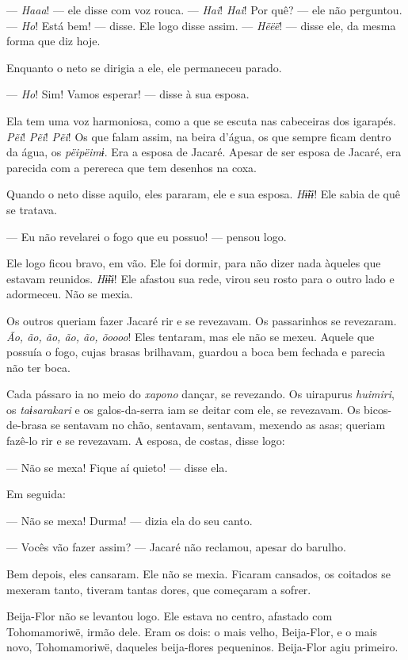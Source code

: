--- \textit{Haaa}! --- ele disse com voz rouca. --- \textit{Hai}! \textit{Hai}! Por quê? --- ele não perguntou. --- \textit{Ho}! Está bem! --- disse. Ele logo disse assim. --- \textit{Hëëë}! --- disse ele, da mesma forma que diz hoje. 

Enquanto o neto se dirigia a ele, ele permaneceu parado. 

--- \textit{Ho}! Sim! Vamos esperar! --- disse à sua esposa. 

Ela tem uma voz harmoniosa, como a que se escuta nas cabeceiras dos
igarapés. \textit{Pẽi}! \textit{Pẽi}! \textit{Pẽi}! Os que falam assim, na beira d'água, os
que sempre ficam dentro da água, os \textit{pëipëimɨ}. Era a esposa de
Jacaré. Apesar de ser esposa de Jacaré, era parecida com a perereca que
tem desenhos na coxa. 

Quando o neto disse aquilo, eles pararam, ele e sua esposa. \textit{Hɨ̃ɨɨ}!
Ele sabia de quê se tratava. 

--- Eu não revelarei o fogo que eu possuo! --- pensou logo. 

Ele logo ficou bravo, em vão. Ele foi dormir, para não dizer nada
àqueles que estavam reunidos. \textit{Hɨ̃ɨɨ}! Ele afastou sua rede, virou
seu rosto para o outro lado e adormeceu. Não se mexia. 

Os outros queriam fazer Jacaré rir e se revezavam. Os passarinhos se
revezaram. \textit{Ão, ão, ão, ão, ão, õoooo}! Eles tentaram, mas ele não
se mexeu. Aquele que possuía o fogo, cujas brasas brilhavam, guardou a
boca bem fechada e parecia não ter boca. 

Cada pássaro ia no meio do \textit{xapono} dançar, se revezando.
Os uirapurus \textit{huimiri}, os \textit{taɨsarakari} e os galos-da-serra iam se deitar
com ele, se revezavam. Os bicos-de-brasa se sentavam no chão, sentavam,
sentavam, mexendo as asas; queriam fazê-lo rir e se revezavam. A esposa,
de costas, disse logo: 

--- Não se mexa! Fique aí quieto! --- disse ela.

Em seguida:

--- Não se mexa! Durma! --- dizia ela do seu canto.

--- Vocês vão fazer assim? --- Jacaré não reclamou, apesar do barulho. 

Bem depois, eles cansaram. Ele não se mexia. Ficaram cansados, os
coitados se mexeram tanto, tiveram tantas dores, que começaram a
sofrer. 

Beija-Flor não se levantou logo. Ele estava no centro, afastado com
Tohomamoriwë, irmão dele. Eram os dois: o mais velho, Beija-Flor, e o
mais novo, Tohomamoriwë, daqueles beija-flores pequeninos. Beija-Flor
agiu primeiro. 

